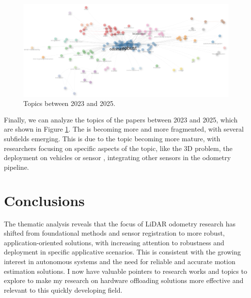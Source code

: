 \documentclass{article}
\begin{document}
\begin{figure}[!htbp]
    \centering
    \includegraphics[width=1.0\textwidth]{img/topics_2023_2025.png}
    \caption{Topics between 2023 and 2025.}
    \label{fig:topics_2023_2025}
\end{figure}

Finally, we can analyze the topics of the papers between 2023 and 2025, which are shown in Figure \ref{fig:topics_2023_2025}. The is becoming more and more fragmented, with several subfields emerging. This is due to the topic becoming more mature, with researchers focusing on specific aspects of the topic, like the 3D  problem, the deployment on  vehicles or sensor , integrating other sensors in the odometry pipeline.

\section{Conclusions}
The thematic analysis reveals that the focus of LiDAR odometry research has shifted from foundational methods and sensor registration to more robust, application-oriented solutions, with increasing attention to robustness and deployment in specific applicative scenarios. This is consistent with the growing interest in autonomous systems and the need for reliable and accurate motion estimation solutions. I now have valuable pointers to research works and topics to explore to make my research on hardware offloading solutions more effective and relevant to this quickly developing field.



\end{document}
